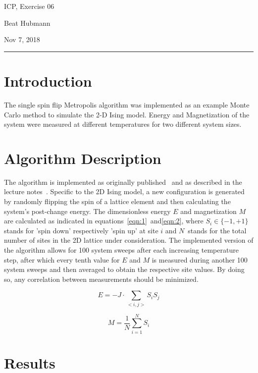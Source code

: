 \documentclass[11pt,a4paper]{article}
\begin{document}
\noindent\parbox{\linewidth}{
 \parbox{.25\linewidth}{ \large ICP, Exercise 06 }\hfill
 \parbox{.5\linewidth}{\begin{center} \large Beat Hubmann \end{center}}\hfill
 \parbox{.2\linewidth}{\begin{flushright} \large Nov 7, 2018 \end{flushright}}
}
\noindent\rule{\linewidth}{2pt}


\section{Introduction}

The single spin flip Metropolis algorithm was implemented as an example Monte Carlo method to simulate
the 2-D Ising model. Energy and Magnetization of the system were measured at different temperatures for two different
system sizes.

\section{Algorithm Description}
The algorithm is implemented as originally published~\cite{metropolis} and as described in the lecture notes~\cite{herrmann}.
Specific to the 2D Ising model, a new configuration is generated by randomly flipping the spin of a lattice element
and then calculating the system's post-change energy.
The dimensionless energy $E$ and magnetization $M$ are calculated as indicated in equations~\ref{eqn:1}~and\ref{eqn:2}, where
$S_i \in \{-1, +1\}$ stands for 'spin down' respectively 'spin up' at site $i$ and $N$~stands for the total number of sites in
the 2D lattice under consideration.
The implemented version of the algorithm allows for 100 system sweeps after each increasing temperature step,
after which every tenth value for $E$ and $M$ is measured during another 100 system sweeps and then averaged to obtain
the respective site values. By doing so, any correlation between measurements should be minimized.

\begin{equation}
	E = -J \cdot \sum_{<i, j>}S_i S_j
\label{eqn:1}
\end{equation}


\begin{equation}
	M = \frac{1}{N}\sum_{i=1}^{N}S_i
\label{eqn:2}
\end{equation}


\section{Results}
\end{document}
